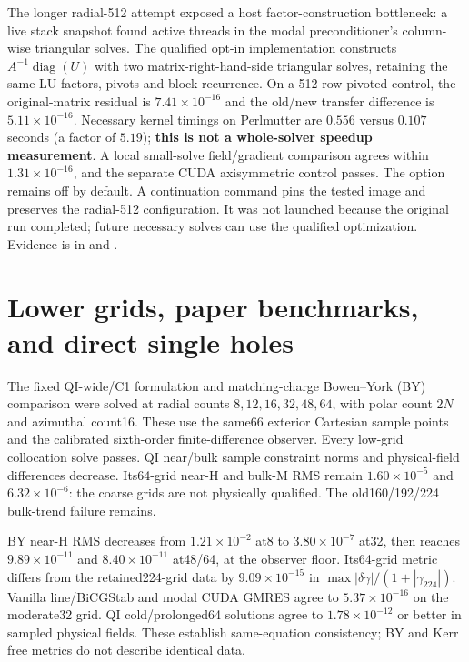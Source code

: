 \documentclass[aps,prd,preprint,notitlepage,nofootinbib]{revtex4-2}
\begin{document}
The longer radial-512 attempt exposed a host factor-construction bottleneck:
a live stack snapshot found active threads in the modal preconditioner's
column-wise triangular solves. The qualified opt-in implementation constructs
$A^{-1}\operatorname{diag}(U)$ with two matrix-right-hand-side triangular solves,
retaining the same LU factors, pivots and block recurrence. On a 512-row
pivoted control, the original-matrix residual is $7.41\times10^{-16}$ and the
old/new transfer difference is $5.11\times10^{-16}$. Necessary kernel timings
on Perlmutter are $0.556$ versus $0.107$ seconds (a factor of $5.19$);
\textbf{this is not a whole-solver speedup measurement}. A local small-solve
field/gradient comparison agrees within $1.31\times10^{-16}$, and the separate
CUDA axisymmetric control passes. The option remains off by default. A
continuation command pins the tested image and preserves the radial-512
configuration. It was not launched because the original run completed;
future necessary solves can use the qualified optimization.
Evidence is in  and
.


\section{Lower grids, paper benchmarks, and direct single holes}
The fixed QI-wide/C1 formulation and matching-charge Bowen--York (BY)
comparison were solved at radial counts $8,12,16,32,48,64$, with polar
count $2N$ and azimuthal count16. These use the same66 exterior Cartesian
sample points and the calibrated sixth-order finite-difference observer.
Every low-grid collocation solve passes. QI near/bulk sample constraint
norms and physical-field differences decrease. Its64-grid near-H and bulk-M
RMS remain $1.60\times10^{-5}$ and $6.32\times10^{-6}$: the coarse grids
are not physically qualified. The old160/192/224 bulk-trend failure remains.

BY near-H RMS decreases from $1.21\times10^{-2}$ at8 to
$3.80\times10^{-7}$ at32, then reaches $9.89\times10^{-11}$ and
$8.40\times10^{-11}$ at48/64, at the observer floor.
Its64-grid metric differs from the retained224-grid data by
$9.09\times10^{-15}$ in $\max|\delta\gamma|/(1+|\gamma_{224}|)$.
Vanilla line/BiCGStab and modal CUDA GMRES agree to $5.37\times10^{-16}$
on the moderate32 grid. QI cold/prolonged64 solutions agree to
$1.78\times10^{-12}$ or better in sampled physical fields. These establish
same-equation consistency; BY and Kerr free metrics do not describe identical data.
\end{document}
